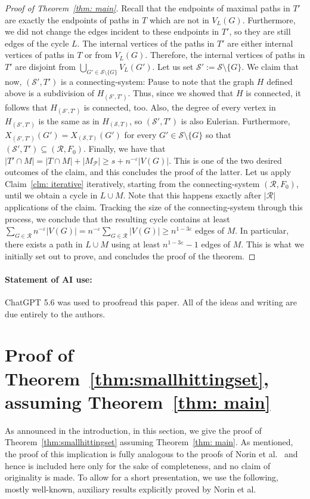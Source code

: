 \documentclass[11pt,reqno]{article}
\newenvironment{claimproof}[1][\proofname]{\proof[#1]\renewcommand{\qedsymbol}{$\blacksquare$}}{\endproof}
\begin{document}
\begin{proof}[Proof of Theorem~\ref{thm: main}]
\begin{claimproof}
    Recall that the endpoints of maximal paths in $T'$ are exactly the endpoints of paths in $T$ which are not in $V_L(G)$. Furthermore, we did not change the edges incident to these endpoints in $T'$, so they are still edges of the cycle $L$. The internal vertices of the paths in $T'$ are either internal vertices of paths in $T$ or from $V_L(G)$. Therefore, the internal vertices of paths in $T'$ are disjoint from $\bigcup_{G'\in \mathcal S\setminus\{G\}}V_L(G')$. Let us set $\mathcal S':=\mathcal S\setminus\{G\}$. We claim that now, $(\mathcal S',T')$ is a connecting-system: Pause to note that the graph $H$ defined above is a subdivision of $H_{(\mathcal S',T')}$. Thus, since we showed that $H$ is connected, it follows that $H_{(\mathcal S',T')}$ is connected, too. Also, the degree of every vertex in $H_{(\mathcal S',T')}$ is the same as in $H_{(\mathcal S,T)}$, so $(\mathcal S',T')$ is also Eulerian. Furthermore, $X_{(\mathcal S',T')}(G')=X_{(\mathcal S,T)}(G')$ for every $G'\in\mathcal S\setminus \{G\}$ so that $(\mathcal S',T')\subseteq (\mathcal R,F_0)$. Finally, we have that $|T'\cap M|=|T\cap M|+|M_{\mathcal P}|\geq s+n^{-\varepsilon}|V(G)|$. This is one of the two desired outcomes of the claim, and this concludes the proof of the latter.
  \end{claimproof} 
  Let us apply Claim~\ref{clm: iterative} iteratively, starting from the connecting-system $(\mathcal R,F_0)$, until we obtain a cycle in $L\cup M$. Note that this happens exactly after $|\mathcal R|$ applications of the claim. Tracking the size of the connecting-system through this process, we conclude that the resulting cycle contains at least $\sum_{G\in\mathcal R}n^{-\varepsilon}|V(G)|=n^{-\varepsilon}\sum_{G\in \mathcal R}|V(G)|\ge n^{1-3\varepsilon}$ edges of $M$. In particular, there exists a path in $L\cup M$ using at least $n^{1-3\varepsilon}-1$ edges of $M$. This is what we initially set out to prove, and concludes the proof of the theorem.
\end{proof}
\paragraph{Statement of AI use:} ChatGPT 5.6 was used to proofread this paper. All of the ideas and writing are due entirely to the authors.



\appendix

\section{Proof of Theorem~\ref{thm:smallhittingset}, assuming Theorem~\ref{thm: main}}
As announced in the introduction, in this section, we give the proof of Theorem~\ref{thm:smallhittingset} assuming Theorem~\ref{thm: main}. As mentioned, the proof of this implication is fully analogous to the proofs of Norin et al.~\cite{norin} and hence is included here only for the sake of completeness, and no claim of originality is made. To allow for a short presentation, we use the following, mostly well-known, auxiliary results explicitly proved by Norin et al.
\end{document}
